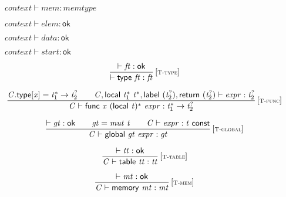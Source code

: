 $\boxed{{\mathit{context}} \vdash {\mathit{mem}} : {\mathit{memtype}}}$

$\boxed{{\mathit{context}} \vdash {\mathit{elem}} : \mathsf{ok}}$

$\boxed{{\mathit{context}} \vdash {\mathit{data}} : \mathsf{ok}}$

$\boxed{{\mathit{context}} \vdash {\mathit{start}} : \mathsf{ok}}$

\vspace{1ex}

$$
\begin{array}{@{}c@{}}\displaystyle
\frac{
{ \vdash }\;{\mathit{ft}} : \mathsf{ok}
}{
{ \vdash }\;\mathsf{type}~{\mathit{ft}} : {\mathit{ft}}
} \, {[\textsc{\scriptsize T{-}type}]}
\qquad
\end{array}
$$

$$
\begin{array}{@{}c@{}}\displaystyle
\frac{
{\mathit{C}}.\mathsf{type}{}[{\mathit{x}}] = {{\mathit{t}}_{{1}}^\ast} \rightarrow {{\mathit{t}}_{{2}}^?}
 \qquad
{\mathit{C}}, \mathsf{local}~{{\mathit{t}}_{{1}}^\ast}~{{\mathit{t}}^\ast}, \mathsf{label}~({{\mathit{t}}_{{2}}^?}), \mathsf{return}~({{\mathit{t}}_{{2}}^?}) \vdash {\mathit{expr}} : {{\mathit{t}}_{{2}}^?}
}{
{\mathit{C}} \vdash \mathsf{func}~{\mathit{x}}~{(\mathsf{local}~{\mathit{t}})^\ast}~{\mathit{expr}} : {{\mathit{t}}_{{1}}^\ast} \rightarrow {{\mathit{t}}_{{2}}^?}
} \, {[\textsc{\scriptsize T{-}func}]}
\qquad
\end{array}
$$

$$
\begin{array}{@{}c@{}}\displaystyle
\frac{
{ \vdash }\;{\mathit{gt}} : \mathsf{ok}
 \qquad
{\mathit{gt}} = {\mathit{mut}}~{\mathit{t}}
 \qquad
{\mathit{C}} \vdash {\mathit{expr}} : {\mathit{t}}~\mathsf{const}
}{
{\mathit{C}} \vdash \mathsf{global}~{\mathit{gt}}~{\mathit{expr}} : {\mathit{gt}}
} \, {[\textsc{\scriptsize T{-}global}]}
\qquad
\end{array}
$$

$$
\begin{array}{@{}c@{}}\displaystyle
\frac{
{ \vdash }\;{\mathit{tt}} : \mathsf{ok}
}{
{\mathit{C}} \vdash \mathsf{table}~{\mathit{tt}} : {\mathit{tt}}
} \, {[\textsc{\scriptsize T{-}table}]}
\qquad
\end{array}
$$

$$
\begin{array}{@{}c@{}}\displaystyle
\frac{
{ \vdash }\;{\mathit{mt}} : \mathsf{ok}
}{
{\mathit{C}} \vdash \mathsf{memory}~{\mathit{mt}} : {\mathit{mt}}
} \, {[\textsc{\scriptsize T{-}mem}]}
\qquad
\end{array}
$$

